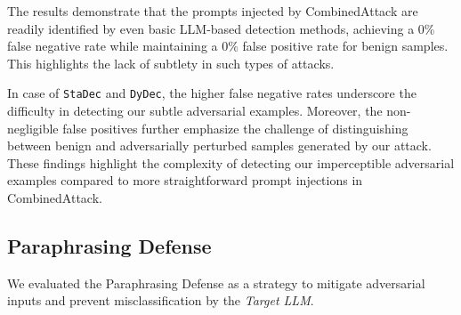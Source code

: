 \documentclass[11pt]{article}
\newcommand \dydec[0]{\texttt{DyDec}}
\newcommand \stadec[0]{\texttt{StaDec}}
\begin{document}
The results demonstrate that the prompts injected by CombinedAttack are readily identified by even basic LLM-based detection methods, achieving a 0\% false negative rate while maintaining a 0\% false positive rate for benign samples. This highlights the lack of subtlety in such types of attacks.


In case of \stadec{} and \dydec{}, the higher false negative rates underscore the difficulty in detecting our subtle adversarial examples. Moreover, the non-negligible false positives further emphasize the challenge of distinguishing between benign and adversarially perturbed samples generated by our attack. These findings highlight the complexity of detecting our imperceptible adversarial examples compared to more straightforward prompt injections in CombinedAttack.

\subsection{Paraphrasing Defense}
We evaluated the Paraphrasing Defense \cite{jain2023baselinedefensesadversarialattacks, 299563} as a strategy to mitigate adversarial inputs and prevent misclassification by the \textsl{Target LLM}. 

\begin{table}[ht!]
\centering
{}
\caption{Mitigation Rate (\%) for Paraphrase-Based Prevention Detection}
\label{tab:paraphrase}
\end{table}
\end{document}
